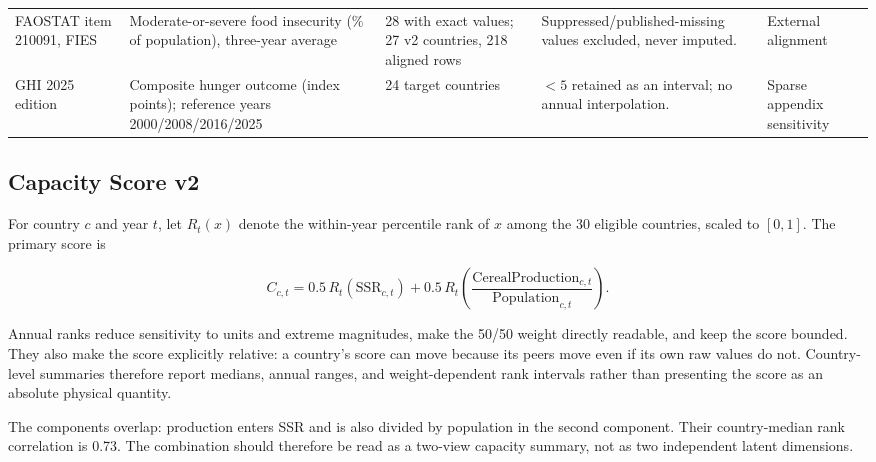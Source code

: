 \documentclass[11pt]{article}
\begin{document}
\begin{table}[H]
\begin{tabularx}{\textwidth}{L{2.45cm} L{3.45cm} L{2.45cm} L{4.20cm} Y}
FAOSTAT item 210091, FIES & Moderate-or-severe food insecurity (\% of population), three-year average & 28 with exact values; 27 v2 countries, 218 aligned rows & Suppressed/published-missing values excluded, never imputed. & External alignment \\
GHI 2025 edition & Composite hunger outcome (index points); reference years 2000/2008/2016/2025 & 24 target countries & $<5$ retained as an interval; no annual interpolation. & Sparse appendix sensitivity \cite{ghimethod} \\
\bottomrule
\end{tabularx}
\end{table}

\subsection{Capacity Score v2}

For country $c$ and year $t$, let $R_{t}(x)$ denote the within-year percentile rank of $x$ among the 30 eligible countries, scaled to $[0,1]$. The primary score is

\begin{equation}
C_{c,t}=0.5\,R_t(\mathrm{SSR}_{c,t})+0.5\,R_t\left(\frac{\mathrm{CerealProduction}_{c,t}}{\mathrm{Population}_{c,t}}\right).
\end{equation}

Annual ranks reduce sensitivity to units and extreme magnitudes, make the 50/50 weight directly readable, and keep the score bounded. They also make the score explicitly relative: a country's score can move because its peers move even if its own raw values do not. Country-level summaries therefore report medians, annual ranges, and weight-dependent rank intervals rather than presenting the score as an absolute physical quantity.

The components overlap: production enters SSR and is also divided by population in the second component. Their country-median rank correlation is 0.73. The combination should therefore be read as a two-view capacity summary, not as two independent latent dimensions.
\end{document}
